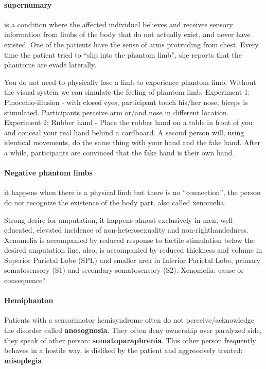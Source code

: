 \documentclass[12pt,article,oneside,a4paper]{memoir}
\begin{document}
\paragraph{supernumary} is a condition where the affected individual believes and receives sensory information from limbs of the body that do not actually exist, and never have existed. One of the patients have the sense of arms protruding from chest. Every time the patient tried to ``slip into the phantom limb'', she reports that the phantoms are evade laterally.

You do not need to physically lose a limb to experience phantom limb. Without the visual system we can simulate the feeling of phantom limb. 
Experiment 1: Pinocchio-illusion - with closed eyes, participant touch his/her nose, biceps is stimulated. Participants perceive arm or/and nose in different location.
Experiment 2: Rubber hand - Place the rubber hand on a table in front of you and conceal your real hand behind a cardboard. A second person will, using identical movements, do the same thing with your hand and the fake hand. After a while, participants are convinced that the fake hand is their own hand.

\paragraph{Negative phantom limbs} it happens when there is a physical limb but there is no ``connection'', the person do not recognize the existence of the body part, also called xenomelia.

Strong desire for amputation, it happens almost exclusively in men, well-educated, elevated incidence of non-heterosexuality and non-righthandedness. Xenomelia is accompanied by reduced response to tactile stimulation below the desired amputation line, also, is accompanied by reduced thickness and volume in Superior Parietal Lobe (SPL) and smaller area in Inferior Parietal Lobe, primary somatosensory (S1) and secondary somatosensory (S2).
Xenomelia: cause or consequence?

\paragraph{Hemiphanton} Patients with a sensorimotor hemisyndrome often do not perceive/acknowledge the disorder called \textbf{anosognosia}. They often deny ownership over paralyzed side, they speak of other person: \textbf{somatoparaphrenia}. This other person frequently behaves in a hostile way, is disliked by the patient and aggressively treated: \textbf{misoplegia}.
\end{document}
